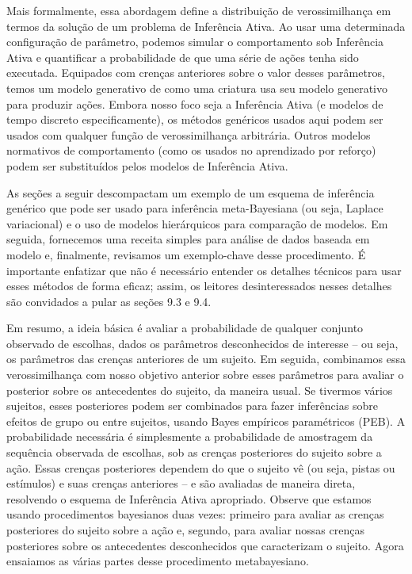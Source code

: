\documentclass[
  12pt,
]{book}
\begin{document}
Mais formalmente, essa abordagem define a distribuição de verossimilhança em termos da solução de um problema de Inferência Ativa. Ao usar uma determinada configuração de parâmetro, podemos simular o comportamento sob Inferência Ativa e quantificar a probabilidade de que uma série de ações tenha sido executada. Equipados com crenças anteriores sobre o valor desses parâmetros, temos um modelo generativo de como uma criatura usa seu modelo generativo para produzir ações. Embora nosso foco seja a Inferência Ativa (e modelos de tempo discreto especificamente), os métodos genéricos usados aqui podem ser usados com qualquer função de verossimilhança arbitrária. Outros modelos normativos de comportamento (como os usados no aprendizado por reforço) podem ser substituídos pelos modelos de Inferência Ativa.

As seções a seguir descompactam um exemplo de um esquema de inferência genérico que pode ser usado para inferência meta-Bayesiana (ou seja, Laplace variacional) e o uso de modelos hierárquicos para comparação de modelos. Em seguida, fornecemos uma receita simples para análise de dados baseada em modelo e, finalmente, revisamos um exemplo-chave desse procedimento. É importante enfatizar que não é necessário entender os detalhes técnicos para usar esses métodos de forma eficaz; assim, os leitores desinteressados nesses detalhes são convidados a pular as seções 9.3 e 9.4.

Em resumo, a ideia básica é avaliar a probabilidade de qualquer conjunto observado de escolhas, dados os parâmetros desconhecidos de interesse -- ou seja, os parâmetros das crenças anteriores de um sujeito. Em seguida, combinamos essa verossimilhança com nosso objetivo anterior sobre esses parâmetros para avaliar o posterior sobre os antecedentes do sujeito, da maneira usual. Se tivermos vários sujeitos, esses posteriores podem ser combinados para fazer inferências sobre efeitos de grupo ou entre sujeitos, usando Bayes empíricos paramétricos (PEB). A probabilidade necessária é simplesmente a probabilidade de amostragem da sequência observada de escolhas, sob as crenças posteriores do sujeito sobre a ação. Essas crenças posteriores dependem do que o sujeito vê (ou seja, pistas ou estímulos) e suas crenças anteriores -- e são avaliadas de maneira direta, resolvendo o esquema de Inferência Ativa apropriado. Observe que estamos usando procedimentos bayesianos duas vezes: primeiro para avaliar as crenças posteriores do sujeito sobre a ação e, segundo, para avaliar nossas crenças posteriores sobre os antecedentes desconhecidos que caracterizam o sujeito. Agora ensaiamos as várias partes desse procedimento metabayesiano.
\end{document}
